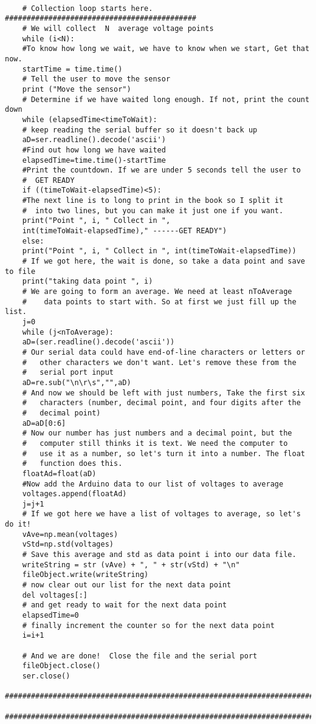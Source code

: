 \begin{verbatim}
	
	# Collection loop starts here. ############################################
	# We will collect  N  average voltage points
	while (i<N):
	#To know how long we wait, we have to know when we start, Get that now.
	startTime = time.time()
	# Tell the user to move the sensor
	print ("Move the sensor")
	# Determine if we have waited long enough. If not, print the count down
	while (elapsedTime<timeToWait):
	# keep reading the serial buffer so it doesn't back up
	aD=ser.readline().decode('ascii')
	#Find out how long we have waited
	elapsedTime=time.time()-startTime
	#Print the countdown. If we are under 5 seconds tell the user to 
	#  GET READY
	if ((timeToWait-elapsedTime)<5):
	#The next line is to long to print in the book so I split it
	#  into two lines, but you can make it just one if you want.
	print("Point ", i, " Collect in ", 
	int(timeToWait-elapsedTime)," ------GET READY")
	else:
	print("Point ", i, " Collect in ", int(timeToWait-elapsedTime))
	# If we got here, the wait is done, so take a data point and save to file
	print("taking data point ", i)
	# We are going to form an average. We need at least nToAverage
	#    data points to start with. So at first we just fill up the list. 
	j=0
	while (j<nToAverage):
	aD=(ser.readline().decode('ascii'))
	# Our serial data could have end-of-line characters or letters or 
	#   other characters we don't want. Let's remove these from the 
	#   serial port input
	aD=re.sub("\n\r\s","",aD)
	# And now we should be left with just numbers, Take the first six 
	#   characters (number, decimal point, and four digits after the
	#   decimal point)
	aD=aD[0:6]
	# Now our number has just numbers and a decimal point, but the 
	#   computer still thinks it is text. We need the computer to 
	#   use it as a number, so let's turn it into a number. The float
	#   function does this. 
	floatAd=float(aD)
	#Now add the Arduino data to our list of voltages to average 
	voltages.append(floatAd) 
	j=j+1
	# If we got here we have a list of voltages to average, so let's do it!    
	vAve=np.mean(voltages)
	vStd=np.std(voltages)
	# Save this average and std as data point i into our data file.
	writeString = str (vAve) + ", " + str(vStd) + "\n"
	fileObject.write(writeString)
	# now clear out our list for the next data point
	del voltages[:]
	# and get ready to wait for the next data point
	elapsedTime=0
	# finally increment the counter so for the next data point
	i=i+1
	
	# And we are done!  Close the file and the serial port
	fileObject.close()
	ser.close()
	##########################################################################
	##########################################################################    
\end{verbatim}

